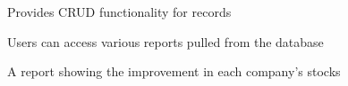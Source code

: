 \documentclass[12pt]{article}
\newcommand\nocaption[1]{\newline\footnotesize\sffamily #1}
\begin{document}
\begin{figure}
\centering
    \nocaption{Provides CRUD functionality for records}
    \label{fig:exam-2}
\end{figure}

\begin{figure}
\centering
    \nocaption{Users can access various reports pulled from the database}
    \label{fig:exam-4}
\end{figure}

\begin{figure}
\centering
    \nocaption{A report showing the improvement in each company's stocks}
    \label{fig:exam-3}
\end{figure}
\end{document}
